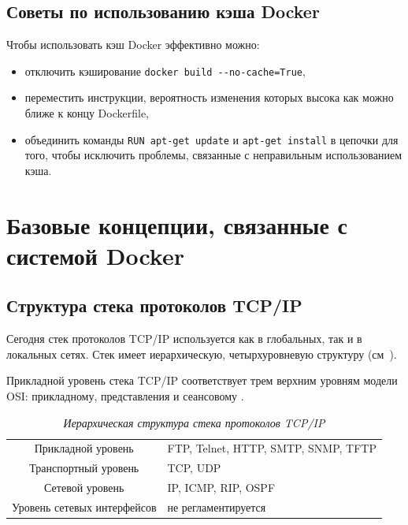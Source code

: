 \documentclass[%
	11pt,
	a4paper,
	utf8,
		]{article}
\begin{document}
\subsection{Советы по использованию кэша Docker}

Чтобы использовать кэш Docker эффективно можно:
\begin{itemize}
	\item отключить кэширование \verb|docker build --no-cache=True|,
	
	\item переместить инструкции, вероятность изменения которых высока как можно ближе к концу Dockerfile,
	
	\item объединить команды \verb|RUN apt-get update| и \verb|apt-get install| в цепочки для того, чтобы исключить проблемы, связанные с неправильным использованием кэша.
\end{itemize}


\section{Базовые концепции, связанные с системой Docker}

\subsection{Структура стека протоколов TCP/IP}

Сегодня стек протоколов TCP/IP используется как в глобальных, так и в локальных сетях. Стек имеет иерархическую, четырхуровневую структуру (см~).

Прикладной уровень стека TCP/IP соответствует трем верхним уровням модели OSI: прикладному, представления и сеансовому \cite{olifer:compnets-2020}.

\begin{table}[h]
	\centering
	\caption{\itshape Иерархическая структура стека протоколов TCP/IP}\label{tab:tcpip}
	\begin{tabular}{cl}
		\rowcolor[gray]{0.96} {Прикладной уровень} & FTP, Telnet, HTTP, SMTP, SNMP, TFTP \\
		Транспортный уровень & TCP, UDP \\
		\rowcolor[gray]{0.96} {Сетевой уровень} & IP, ICMP, RIP, OSPF \\
		Уровень сетевых интерфейсов & не регламентируется
	\end{tabular}
\end{table}
\end{document}
